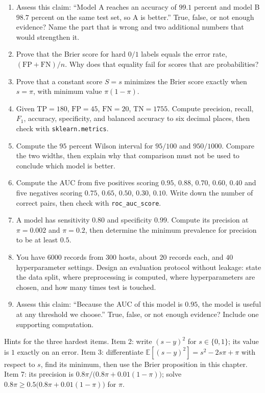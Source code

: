 \begin{latihan}
\begin{enumerate}
  \item Assess this claim: ``Model A reaches an accuracy of $99.1$ percent and model B $98.7$
        percent on the same test set, so A is better.'' True, false, or not enough evidence? Name
        the part that is wrong and two additional numbers that would strengthen it.
  \item Prove that the Brier score for hard $0/1$ labels equals the error rate,
        $(\mathrm{FP}+\mathrm{FN})/n$. Why does that equality fail for scores that are
        probabilities?
  \item Prove that a constant score $S=s$ minimizes the Brier score exactly when $s=\pi$, with
        minimum value $\pi(1-\pi)$.
  \item Given $\mathrm{TP}=180$, $\mathrm{FP}=45$, $\mathrm{FN}=20$, $\mathrm{TN}=1755$. Compute
        precision, recall, $F_1$, accuracy, specificity, and balanced accuracy to six decimal
        places, then check with \texttt{sklearn.metrics}.
  \item Compute the $95$ percent Wilson interval for $95/100$ and $950/1000$. Compare the two
        widths, then explain why that comparison must not be used to conclude which model is
        better.
  \item Compute the AUC from five positives scoring $0.95$, $0.88$, $0.70$, $0.60$, $0.40$ and five
        negatives scoring $0.75$, $0.65$, $0.50$, $0.30$, $0.10$. Write down the number of correct
        pairs, then check with \texttt{roc\_auc\_score}.
  \item A model has sensitivity $0.80$ and specificity $0.99$. Compute its precision at
        $\pi=0.002$ and $\pi=0.2$, then determine the minimum prevalence for precision to be at
        least $0.5$.
  \item You have $6000$ records from $300$ hosts, about $20$ records each, and $40$ hyperparameter
        settings. Design an evaluation protocol without leakage: state the data split, where
        preprocessing is computed, where hyperparameters are chosen, and how many times test is
        touched.
  \item Assess this claim: ``Because the AUC of this model is $0.95$, the model is useful at any
        threshold we choose.'' True, false, or not enough evidence? Include one supporting
        computation.
\end{enumerate}

Hints for the three hardest items. Item 2: write $(s-y)^2$ for $s\in\{0,1\}$; its value is $1$
exactly on an error. Item 3: differentiate $\mathbb{E}[(s-y)^2]=s^2-2s\pi+\pi$ with respect to
$s$, find its minimum, then use the Brier proposition in this chapter. Item 7: its precision is
$0.8\pi/\bigl(0.8\pi+0.01(1-\pi)\bigr)$; solve
$0.8\pi\ge0.5\bigl(0.8\pi+0.01(1-\pi)\bigr)$ for $\pi$.
\end{latihan}

